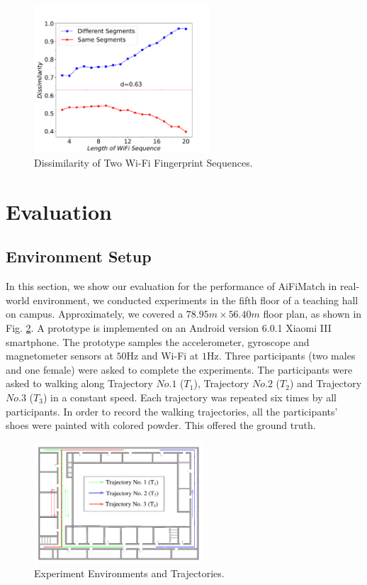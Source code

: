 \documentclass[conference]{IEEEtran}
\begin{document}
\begin{figure}[!htbp]
	\centering
		\includegraphics[width=2.58in]{AiFiMatch-WiFiDist}
		\caption{Dissimilarity of Two Wi-Fi Fingerprint Sequences.}
	\label{fig-wifidist}
\end{figure}

\section{Evaluation}

\subsection{Environment Setup}

In this section, we show our evaluation for the performance of AiFiMatch in real-world environment, we conducted experiments in the fifth floor of a teaching hall on campus. Approximately, we covered a $78.95m \times 56.40m$ floor plan, as shown in Fig. \ref{fig-envionment}. A prototype is implemented on an Android version 6.0.1 Xiaomi III smartphone. The prototype samples the accelerometer, gyroscope and magnetometer sensors at $50$Hz and Wi-Fi at $1$Hz. Three participants (two males and one female) were asked to complete the experiments. The participants were asked to walking along Trajectory $No.1$ ($T_1$), Trajectory $No.2$ ($T_2$) and Trajectory $No.3$ ($T_3$) in a constant speed. Each trajectory was repeated six times by all participants. In order to record the walking trajectories, all the participants' shoes were painted with colored powder. This offered the ground truth.

\begin{figure}[!htbp]
	\centering
	\includegraphics[width=2.48in]{AiFiMatch-Environment}
	\caption{Experiment Environments and Trajectories.}
	\label{fig-envionment}
\end{figure}
\end{document}
